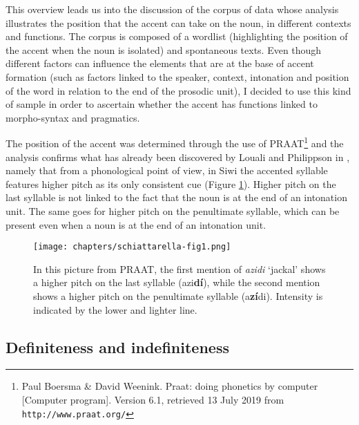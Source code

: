 \documentclass[output=paper]{langsci/langscibook}
\begin{document}
This overview leads us into the discussion of the corpus of data whose analysis illustrates the position that the accent can take on the noun, in different contexts and functions. The corpus is composed of a wordlist (highlighting the position of the accent when the noun is isolated) and spontaneous texts. Even though different factors can influence the elements that are at the base of accent formation (such as factors linked to the speaker, context, intonation and position of the word in relation to the end of the prosodic unit), I decided to use this kind of sample in order to ascertain whether the accent has functions linked to morpho-syntax and pragmatics.

The position of the accent was determined through the use of PRAAT\footnote{Paul Boersma \& David Weenink. Praat: doing phonetics by computer [Computer program]. Version 6.1, retrieved 13 July 2019 from {\footnotesize{\texttt{http://www.praat.org/}}} } and the analysis confirms what has already been discovered by Louali and Philippson in \citeyear{louali:philippson:04}, namely that from a phonological point of view, in Siwi the accented syllable features higher pitch as its only consistent cue (Figure \ref{5fig:1}). Higher pitch on the last syllable is not linked to the fact that the noun is at the end of an intonation unit. The same goes for higher pitch on the penultimate syllable, which can be present even when a noun is at the end of an intonation unit. 

\begin{figure}[H]
\centering
\texttt{[image: chapters/schiattarella-fig1.png]}
\caption{In this picture from PRAAT, the first mention of {\emph{azidi}} `jackal' shows a higher pitch on the last syllable (azi{\bf{dí}}), while the second mention shows a higher pitch on the penultimate syllable (a{\bf{zí}}di). Intensity is indicated by the lower and lighter line.}\label{5fig:1}
\end{figure}


\subsection{Definiteness and indefiniteness}\label{5sec:14}
\end{document}
